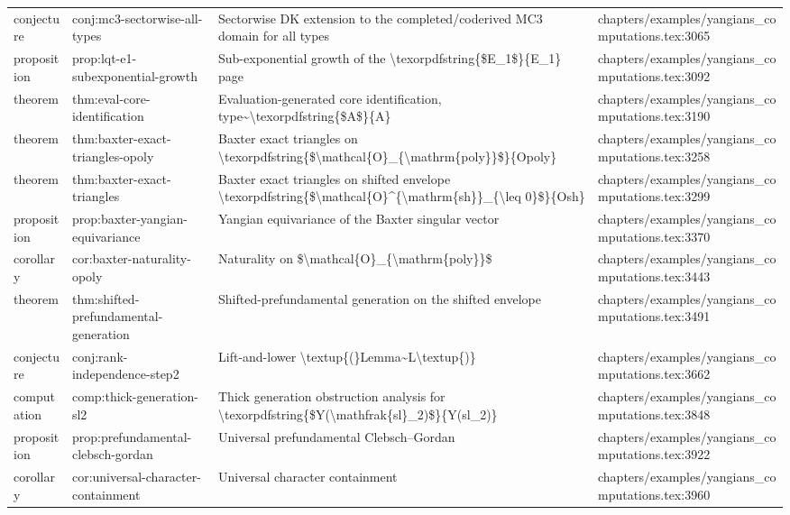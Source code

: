 \documentclass[11pt]{article}
\begin{document}
\begin{longtable}{L{0.10\textwidth}L{0.26\textwidth}L{0.42\textwidth}L{0.22\textwidth}}
conjecture & conj:mc3-sectorwise-all-types & Sectorwise DK extension to the completed/coderived MC3 domain for all types & chapters/examples/yangians\_computations.tex:3065\\
proposition & prop:lqt-e1-subexponential-growth & Sub-exponential growth of the \textbackslash{}texorpdfstring\{\$E\_1\$\}\{E\_1\} page & chapters/examples/yangians\_computations.tex:3092\\
theorem & thm:eval-core-identification & Evaluation-generated core identification, type\textasciitilde{}\textbackslash{}texorpdfstring\{\$A\$\}\{A\} & chapters/examples/yangians\_computations.tex:3190\\
theorem & thm:baxter-exact-triangles-opoly & Baxter exact triangles on \textbackslash{}texorpdfstring\{\$\textbackslash{}mathcal\{O\}\_\{\textbackslash{}mathrm\{poly\}\}\$\}\{Opoly\} & chapters/examples/yangians\_computations.tex:3258\\
theorem & thm:baxter-exact-triangles & Baxter exact triangles on shifted envelope \textbackslash{}texorpdfstring\{\$\textbackslash{}mathcal\{O\}\textasciicircum{}\{\textbackslash{}mathrm\{sh\}\}\_\{\textbackslash{}leq 0\}\$\}\{Osh\} & chapters/examples/yangians\_computations.tex:3299\\
proposition & prop:baxter-yangian-equivariance & Yangian equivariance of the Baxter singular vector & chapters/examples/yangians\_computations.tex:3370\\
corollary & cor:baxter-naturality-opoly & Naturality on \$\textbackslash{}mathcal\{O\}\_\{\textbackslash{}mathrm\{poly\}\}\$ & chapters/examples/yangians\_computations.tex:3443\\
theorem & thm:shifted-prefundamental-generation & Shifted-prefundamental generation on the shifted envelope & chapters/examples/yangians\_computations.tex:3491\\
conjecture & conj:rank-independence-step2 & Lift-and-lower \textbackslash{}textup\{(\}Lemma\textasciitilde{}L\textbackslash{}textup\{)\} & chapters/examples/yangians\_computations.tex:3662\\
computation & comp:thick-generation-sl2 & Thick generation obstruction analysis for \textbackslash{}texorpdfstring\{\$Y(\textbackslash{}mathfrak\{sl\}\_2)\$\}\{Y(sl\_2)\} & chapters/examples/yangians\_computations.tex:3848\\
proposition & prop:prefundamental-clebsch-gordan & Universal prefundamental Clebsch--Gordan & chapters/examples/yangians\_computations.tex:3922\\
corollary & cor:universal-character-containment & Universal character containment & chapters/examples/yangians\_computations.tex:3960\\

\end{longtable}
\end{document}

